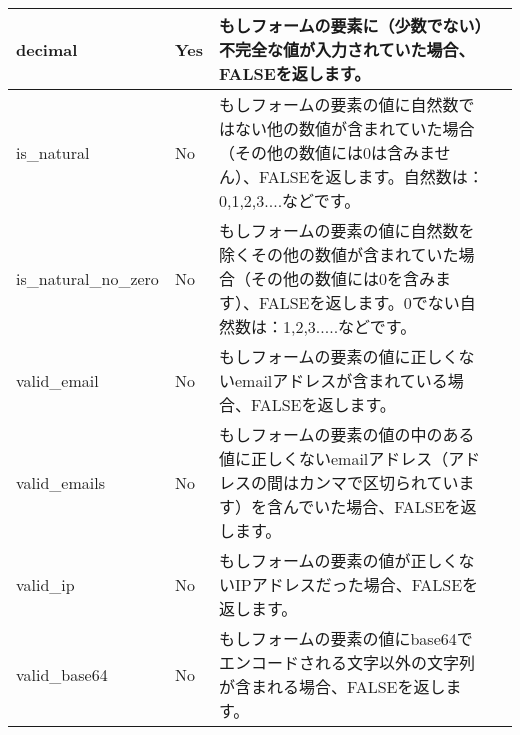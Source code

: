 \begin{longtable}{|l|l|p{6cm}|l|}
decimal &	Yes &	もしフォームの要素に（少数でない）不完全な値が入力されていた場合、FALSEを返します。 	 & {}  \\ \hline
is\_natural &	No &	もしフォームの要素の値に自然数ではない他の数値が含まれていた場合（その他の数値には0は含みません）、FALSEを返します。自然数は：0,1,2,3....などです。 & {}  \\ \hline	 
is\_natural\_no\_zero &	No &	もしフォームの要素の値に自然数を除くその他の数値が含まれていた場合（その他の数値には0を含みます）、FALSEを返します。0でない自然数は：1,2,3.....などです。 	 & {}  \\ \hline
valid\_email &	No &	もしフォームの要素の値に正しくないemailアドレスが含まれている場合、FALSEを返します。 	& {}  \\ \hline 
valid\_emails &	No &	もしフォームの要素の値の中のある値に正しくないemailアドレス（アドレスの間はカンマで区切られています）を含んでいた場合、FALSEを返します。 & {}  \\ \hline	 
valid\_ip &	No &	もしフォームの要素の値が正しくないIPアドレスだった場合、FALSEを返します。 	 & {}  \\ \hline
valid\_base64 &	No &	もしフォームの要素の値にbase64でエンコードされる文字以外の文字列が含まれる場合、FALSEを返します。 	 & {}  \\ \hline
\end{longtable}

